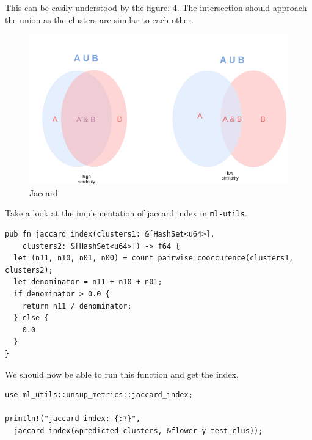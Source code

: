 \documentclass{book}
\begin{document}
This can be easily understood by the figure: 4. The intersection should approach the union as the clusters are similar to each other.

\begin{figure}[]
	\centering
	\includegraphics[width=0.8\linewidth]{jaccard.png}
	\caption{Jaccard}
	\label{fig:jaccard}
\end{figure}

Take a look at the implementation of jaccard index in \lstinline{ml-utils}.

\begin{lstlisting}[caption={ml\\-utils\\/src\\/unsup\_metrics\\.rs}]
pub fn jaccard_index(clusters1: &[HashSet<u64>],
    clusters2: &[HashSet<u64>]) -> f64 {
  let (n11, n10, n01, n00) = count_pairwise_cooccurence(clusters1, clusters2);
  let denominator = n11 + n10 + n01;
  if denominator > 0.0 {
    return n11 / denominator;
  } else {
    0.0
  }
}
\end{lstlisting}

We should now be able to run this function and get the index.

\begin{lstlisting}[caption={ml\\-utils\\/src\\/unsup\_metrics\\.rs}]
use ml_utils::unsup_metrics::jaccard_index;

println!("jaccard index: {:?}",
  jaccard_index(&predicted_clusters, &flower_y_test_clus));
\end{lstlisting}

\label{par:jaccard_index}

\end{document}
